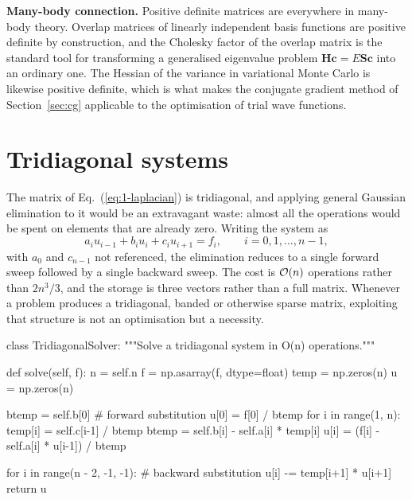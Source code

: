 \begin{notebox}
\textbf{Many-body connection.} Positive definite matrices are everywhere in
many-body theory.  Overlap matrices of linearly independent basis functions
are positive definite by construction, and the Cholesky factor of the overlap
matrix is the standard tool for transforming a generalised eigenvalue problem
$\bm{H}\bm{c}=E\bm{S}\bm{c}$ into an ordinary one.  The Hessian of the
variance in variational Monte Carlo is likewise positive definite, which is
what makes the conjugate gradient method of Section~\ref{sec:cg} applicable
to the optimisation of trial wave functions.
\end{notebox}

\section{Tridiagonal systems}
\label{sec:tridiag}

The matrix of Eq.~(\ref{eq:1-laplacian}) is tridiagonal, and applying general
Gaussian elimination to it would be an extravagant waste: almost all the
operations would be spent on elements that are already zero.  Writing the
system as
\begin{equation}
  a_i u_{i-1} + b_i u_i + c_i u_{i+1} = f_i ,
  \qquad i=0,1,\dots,n-1,
  \label{eq:1-tridiag}
\end{equation}
with $a_0$ and $c_{n-1}$ not referenced, the elimination reduces to a single
forward sweep followed by a single backward sweep.  The cost is $\mathcal{O}(n)$
operations rather than $2n^3/3$, and the storage is three vectors rather than
a full matrix.  Whenever a problem produces a tridiagonal, banded or
otherwise sparse matrix, exploiting that structure is not an optimisation but
a necessity.

\begin{Python}{}
class TridiagonalSolver:
    """Solve a tridiagonal system in O(n) operations."""

    def solve(self, f):
        n = self.n
        f = np.asarray(f, dtype=float)
        temp = np.zeros(n)
        u = np.zeros(n)

        btemp = self.b[0]                       # forward substitution
        u[0] = f[0] / btemp
        for i in range(1, n):
            temp[i] = self.c[i-1] / btemp
            btemp = self.b[i] - self.a[i] * temp[i]
            u[i] = (f[i] - self.a[i] * u[i-1]) / btemp

        for i in range(n - 2, -1, -1):          # backward substitution
            u[i] -= temp[i+1] * u[i+1]
        return u
\end{Python}

